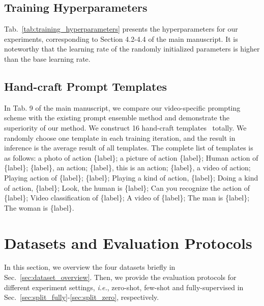 \documentclass[runningheads]{llncs}
\begin{document}
\subsection{Training Hyperparameters}\label{sec:train_hyper}

Tab.~\ref{tab:training_hyperparameters} presents the hyperparameters for our experiments, corresponding to Section 4.2-4.4 of the main manuscript. It is noteworthy that the learning rate of the randomly initialized parameters is  higher than the base learning rate.
\vspace{-0.3cm}
\subsection{Hand-craft Prompt Templates}\label{sec:prompt}
In Tab. 9 of the main manuscript, we compare our video-specific prompting scheme with the existing prompt ensemble method \cite{clip} and demonstrate the superiority of our method. We construct 16 hand-craft templates~\cite{wang2021actionclip} totally. We randomly choose one template in each training iteration, and the result in inference is the average result of all templates. The complete list of templates is as follows: a photo of action \{label\}; a picture of action \{label\};
Human action of \{label\}; \{label\}, an action; \{label\}, this is an action; \{label\}, a video of action; Playing action of \{label\}; \{label\}; Playing a kind of action, \{label\}; Doing a kind of action, \{label\}; Look, the human is \{label\}; Can you recognize the action of \{label\}; Video classification of \{label\}; A video of \{label\}; The man is \{label\}; The woman is \{label\}.


\section{Datasets and Evaluation Protocols}\label{sec:dataset}
In this section, we overview the four datasets briefly in Sec.~\ref{sec:dataset_overview}. 
Then, we provide the evaluation protocols for different experiment settings, \emph{i.e.}, zero-shot, few-shot and fully-supervised in Sec.~\ref{sec:split_fully}-\ref{sec:split_zero}, respectively.
\end{document}
